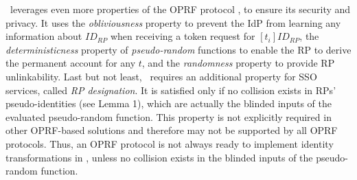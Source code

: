 


\usso\ leverages even more properties of the OPRF protocol \cite{oprf-proved,voprf-proved}, %
 to ensure its security and privacy. %
It uses the \emph{obliviousness} property to prevent the IdP from learning any information about $ID_{RP}$ when receiving a token request for $[t_i]ID_{RP}$, the \emph{deterministicness} property of \emph{pseudo-random} functions to enable the RP to derive the permanent account for any $t$,
and the \emph{randomness} property to provide RP unlinkability.
Last but not least, \usso\ requires an additional property for SSO services, called \emph{RP designation}.
It is satisfied only if no collision exists in RPs' pseudo-identities (see Lemma 1), which are actually the blinded inputs of the evaluated pseudo-random function.
This property   %
is not explicitly required in other OPRF-based solutions and therefore may not be supported by all OPRF protocols.
Thus, an OPRF protocol is not always ready to implement identity transformations in \usso, unless no collision exists in the blinded inputs of the pseudo-random function.

